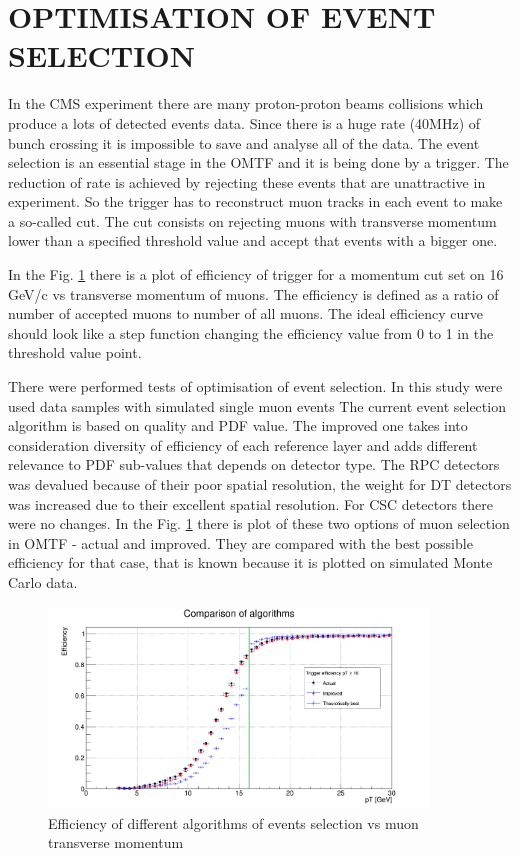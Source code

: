 \section{OPTIMISATION OF EVENT SELECTION}  

In the CMS experiment there are many proton-proton beams collisions which produce a lots of detected events data.
Since there is a huge rate (40MHz) of bunch crossing it is impossible to save and analyse all of the data.
The event selection is an essential stage in the OMTF and it is being done by a trigger.
The reduction of rate is achieved by rejecting these events that are unattractive in experiment.
So the trigger has to reconstruct muon tracks in each event to make a so-called cut.
The cut consists on rejecting muons with transverse momentum lower than a specified threshold value and accept that events with a bigger one.

In the Fig. \ref{eff} there is a plot of efficiency of trigger for a momentum cut set on 16 GeV/c vs transverse momentum of muons.
The efficiency is defined as a ratio of number of accepted muons to number of all muons.
The ideal efficiency curve should look like a step function changing the efficiency value from 0 to 1 in the threshold value point.

There were performed tests of optimisation of event selection.
In this study were used data samples with simulated single muon events
The current event selection algorithm is based on quality and PDF value.
The improved one takes into consideration diversity of efficiency of each reference layer and adds different relevance to PDF sub-values that depends on detector type.
The RPC detectors was devalued because of their poor spatial resolution, the weight for DT detectors was increased due to their excellent spatial resolution.
For CSC detectors there were no changes.
In the Fig. \ref{eff} there is plot of these two options of muon selection in OMTF - actual and improved.
They are compared with the best possible efficiency for that case, that is known because it is plotted on simulated Monte Carlo data.

\begin{figure}[ht]
\centering
\includegraphics[width=0.9\textwidth]{Hist16.png}
\caption{Efficiency of different algorithms of events selection vs muon transverse momentum}
\label{eff}
\end{figure} 

